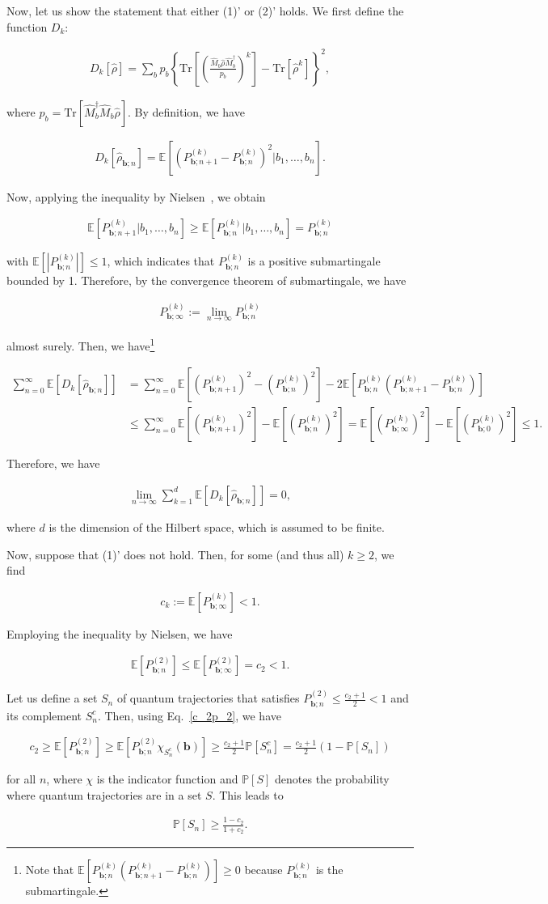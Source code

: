\documentclass[preprint,pteplogo]{ptephy_v2}%
\numberwithin{equation}{section}
\theoremstyle{definition}
\newcommand{\mr}[1]{\mathrm{#1}}
\newcommand{\mbb}[1]{\mathbb{#1}}
\newcommand{\lrs}[1]{\left( #1 \right)}
\newcommand{\lrm}[1]{{\left\{ #1 \right\}}}
\newcommand{\lrl}[1]{\left[ #1 \right]}
\newcommand{\aln}[1]{
\begin{align}
#1
\end{align}
}
\newcommand{\ra}{\rightarrow}
\newcommand{\Tr}{\mr{Tr}}
\begin{document}
Now, let us show the statement that either (1)' or (2)' holds.
We first define the function $D_k$:
\aln{
D_k[\hat{\rho}]=\sum_bp_b\lrm{\Tr\lrl{\lrs{\frac{\hat{M}_b\hat{\rho}\hat{M}_b^\dag}{p_b}}^k}-\Tr[\hat{\rho}^k]}^2,
}
where $p_b=\Tr[\hat{M}_b^\dag\hat{M}_b\hat{\rho}]$.
By definition, we have
\aln{
D_k[\hat{\rho}_{\bm{b};n}]=\mbb{E}\lrl{(P_{\bm{b};n+1}^{(k)}-P_{\bm{b};n}^{(k)})^2|b_1,\ldots,b_n}.
}
Now, applying the inequality by Nielsen~\cite{nielsen2001characterizing}, we obtain
\aln{
\mbb{E}\lrl{P_{\bm{b};n+1}^{(k)}|b_1,\ldots,b_n}\geq \mbb{E}\lrl{P_{\bm{b};n}^{(k)}|b_1,\ldots,b_n}=P_{\bm{b};n}^{(k)}
}
with $\mbb{E}[|P_{\bm{b};n}^{(k)}|]\leq 1$, which indicates that $P_{\bm{b};n}^{(k)}$ is a positive submartingale bounded by 1.
Therefore, by the convergence theorem of submartingale, we have 
\aln{
P_{\bm{b};\infty}^{(k)}:=\lim_{n\ra\infty}P_{\bm{b};n}^{(k)}
}
almost surely.
Then, we have\footnote{
Note that $\mbb{E}\lrl{P_{\bm{b};n}^{(k)}\lrs{P_{\bm{b};n+1}^{(k)}-P_{\bm{b};n}^{(k)}}}\geq 0$ because $P_{\bm{b};n}^{(k)}$ is the submartingale.
}
\aln{
\sum_{n=0}^\infty\mbb{E}[D_k[\hat{\rho}_{\bm{b};n}]]
&= \sum_{n=0}^\infty\mbb{E}\lrl{{\lrs{P_{\bm{b};n+1}^{(k)}}^2-\lrs{P_{\bm{b};n}^{(k)}}^2}}-2\mbb{E}\lrl{P_{\bm{b};n}^{(k)}\lrs{P_{\bm{b};n+1}^{(k)}-P_{\bm{b};n}^{(k)}}}\nonumber\\
&\leq\sum_{n=0}^\infty\mbb{E}\lrl{\lrs{P_{\bm{b};n+1}^{(k)}}^2}-\mbb{E}\lrl{\lrs{P_{\bm{b};n}^{(k)}}^2}
= \mbb{E}\lrl{\lrs{P_{\bm{b};\infty}^{(k)}}^2}-\mbb{E}\lrl{\lrs{P_{\bm{b};0}^{(k)}}^2}\leq 1.
}
Therefore, we have
\aln{\label{EDk0}
\lim_{n\ra\infty}\sum_{k=1}^d\mbb{E}\lrl{D_k[\hat{\rho}_{\bm{b};n}]}=0,
}
where $d$ is the dimension of the Hilbert space, which is assumed to be finite.

Now, suppose that (1)' does not hold. Then, for some (and thus all) $k\geq 2$, we find 
\aln{
c_k:=\mbb{E}\lrl{P_{\bm{b};\infty}^{(k)}}<1.
}
Employing the inequality by Nielsen, we have
\aln{\label{c_2p_2}
\mbb{E}[P_{\bm{b};n}^{(2)}]\leq \mbb{E}[P_{\bm{b};\infty}^{(2)}]=c_2<1.
}

Let us define a set $S_n$ of quantum trajectories that satisfies $P_{\bm{b};n}^{(2)}\leq \frac{c_2+1}{2}<1$ and its complement $S_n^c$.
Then, using Eq.~\eqref{c_2p_2}, we have
\aln{
c_2\geq \mbb{E}\lrl{P_{\bm{b};n}^{(2)}}\geq \mbb{E}\lrl{P_{\bm{b};n}^{(2)}\chi_{S_n^c}(\bm{b})}
\geq \frac{c_2+1}{2}\mbb{P}[S_n^c]=\frac{c_2+1}{2}\lrs{1-\mbb{P}[S_n]}
}
for all $n$, where $\chi$ is the indicator function and $\mbb{P}[S]$ denotes the probability where quantum trajectories are in a set $S$.
This leads to 
\aln{\label{psnc2}
\mbb{P}[S_n]\geq \frac{1-c_2}{1+c_2}.
}
\end{document}
